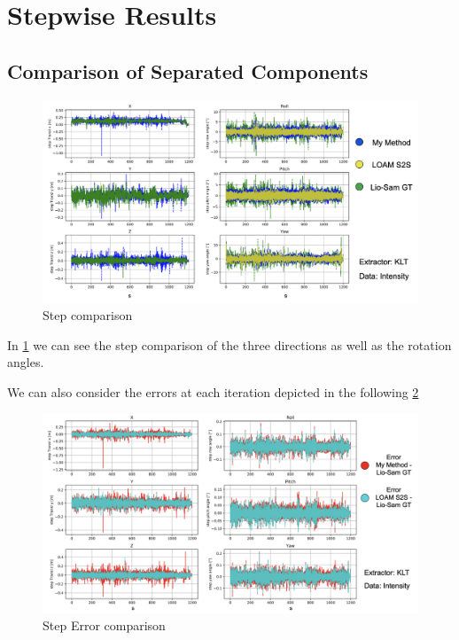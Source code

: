 \section{Stepwise Results}{

    \subsection{Comparison of Separated Components}{
    \begin{figure}[ht]
        \centering
        \includegraphics[scale = 0.26]{images/results/steps_klt.png}
        \caption{Step comparison}
        \label{fig:step_comparison_klt}
    \end{figure}

    In \cref{fig:step_comparison_klt} we can see the step comparison of the three directions as well as the rotation angles. 
    
    We can also consider the errors at each iteration depicted in the following \cref{fig:step_error_comparison_klt}
    \begin{figure}[ht]
        \centering
        \includegraphics[scale = 0.285]{images/results/step_error_klt.png}
        \caption{Step Error comparison}
        \label{fig:step_error_comparison_klt}
    \end{figure}



}}
